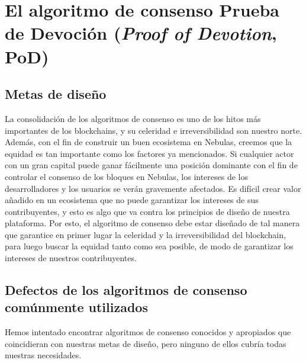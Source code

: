 \section{El algoritmo de consenso Prueba de Devoción (\textit{Proof of Devotion}, PoD)}
\label{sec:pod}

\subsection{Metas de diseño}
\label{pod:goals}

La consolidación de los algoritmos de consenso es uno de los hitos más importantes de los blockchains, y su celeridad e irreversibilidad son nuestro norte. Además, con el fin de construir un buen ecosistema en Nebulas, creemos que la equidad es tan importante como los factores ya mencionados. Si cualquier actor con un gran capital puede ganar fácilmente una posición dominante con el fin de controlar el consenso de los bloques en Nebulas, los intereses de los desarrolladores y los usuarios se verán gravemente afectados. Es difícil crear valor añadido en un ecosistema que no puede garantizar los intereses de sus contribuyentes, y esto es algo que va contra los principios de diseño de nuestra plataforma. Por esto, el algoritmo de consenso debe estar diseñado de tal manera que garantice en primer lugar la celeridad y la irreversibilidad del blockchain, para luego buscar la equidad tanto como sea posible, de modo de garantizar los intereses de nuestros contribuyentes.

\subsection{Defectos de los algoritmos de consenso comúnmente utilizados}
\label{pod:weakness}

Hemos intentado encontrar algoritmos de consenso conocidos y apropiados que coincidieran con nuestras metas de diseño, pero ninguno de ellos cubría todas nuestras necesidades.

